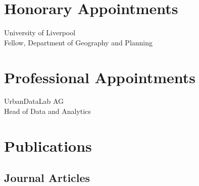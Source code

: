 \documentclass[12pt,a4paper]{report}
\begin{document}
    \section*{Honorary Appointments}

    \begin{tablist}

        \item[2022--] \tab{}University of Liverpool \\
                            Fellow, Department of Geography and Planning \\

    \end{tablist}


    \section*{Professional Appointments}

    \begin{tablist}

        \item[2022--23] \tab{}UrbanDataLab AG \\
                            Head of Data and Analytics \\

    \end{tablist}

    \section*{Publications}

    \subsection*{Journal Articles}
\end{document}
